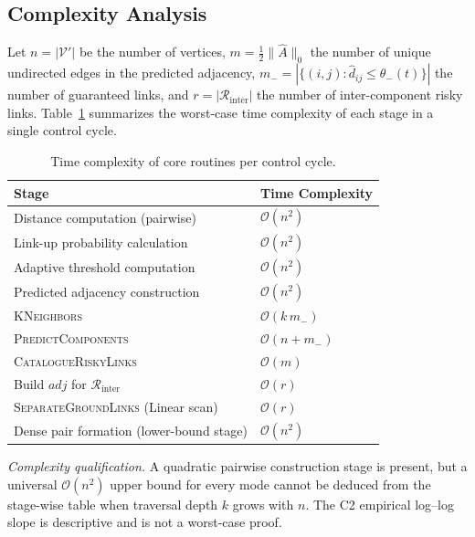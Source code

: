 \documentclass[preprint,12pt]{elsarticle}
\theoremstyle{definition}\newtheorem{definition}{Definition}
\theoremstyle{plain}\newtheorem{theorem}{Theorem}
\theoremstyle{plain}\newtheorem{lemma}{Lemma}
\theoremstyle{plain}\newtheorem{corollary}{Corollary}
\theoremstyle{plain}\newtheorem{assumption}{Assumption}
\theoremstyle{remark}\newtheorem{remark}[theorem]{Remark}
\begin{document}
\subsection{Complexity Analysis}
\label{subsec:complexity}
Let $n=|\mathcal V'|$ be the number of vertices, $m = \frac{1}{2}\|\widehat A\|_0$ the number of unique undirected edges in the predicted adjacency, $m_- = |\{(i,j):\widehat d_{ij}\le\theta_-(t)\}|$ the number of guaranteed links, and $r=|\mathcal R_{\mathrm{inter}}|$ the number of inter-component risky links. Table~\ref{tab:complexity} summarizes the worst-case time complexity of each stage in a single control cycle.

\begin{table}[H]
  \centering
  \caption{Time complexity of core routines per control cycle.}
  \label{tab:complexity}
  \renewcommand{\arraystretch}{1.2}
  \begin{tabular}{@{}ll@{}}
    \toprule
    \textbf{Stage} & \textbf{Time Complexity}\\
    \midrule
    Distance computation (pairwise)        & $\mathcal O(n^2)$\\
    Link-up probability calculation       & $\mathcal O(n^2)$\\
    Adaptive threshold computation        & $\mathcal O(n^2)$\\
    Predicted adjacency construction      & $\mathcal O(n^2)$\\
    \textsc{KNeighbors}                   & $\mathcal O(k\,m_-)$\\
    \textsc{PredictComponents}            & $\mathcal O(n + m_-)$\\
    \textsc{CatalogueRiskyLinks}          & $\mathcal O(m)$\\
    Build $adj$ for $\mathcal R_{\mathrm{inter}}$ & $\mathcal O(r)$\\
    \textsc{SeparateGroundLinks} (Linear scan)        & $\mathcal O(r)$\\
    \midrule
    Dense pair formation (lower-bound stage) & $\mathcal O(n^2)$\\
    \bottomrule
  \end{tabular}
\end{table}

\noindent\emph{Complexity qualification.} A quadratic pairwise construction stage is present, but a universal $\mathcal O(n^2)$ upper bound for every mode cannot be deduced from the stage-wise table when traversal depth $k$ grows with $n$. The C2 empirical log--log slope is descriptive and is not a worst-case proof.
\end{document}
